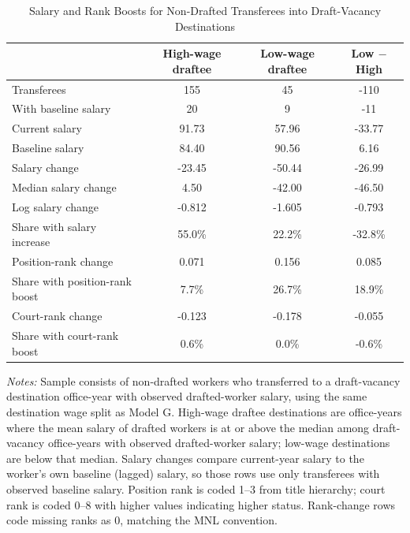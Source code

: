 \begin{table}[htbp]
\centering
\caption{Salary and Rank Boosts for Non-Drafted Transferees into Draft-Vacancy Destinations}
\label{tab:misallocation-destination-draftee-wage}
\footnotesize
\begin{threeparttable}
\begin{tabular}{lccc}
\toprule
 & High-wage draftee & Low-wage draftee & Low $-$ High \\
\midrule
Transferees & 155 & 45 & -110 \\
With baseline salary & 20 & 9 & -11 \\
Current salary & 91.73 & 57.96 & -33.77 \\
Baseline salary & 84.40 & 90.56 & 6.16 \\
Salary change & -23.45 & -50.44 & -26.99 \\
Median salary change & 4.50 & -42.00 & -46.50 \\
Log salary change & -0.812 & -1.605 & -0.793 \\
Share with salary increase & 55.0\% & 22.2\% & -32.8\% \\
\midrule
Position-rank change & 0.071 & 0.156 & 0.085 \\
Share with position-rank boost & 7.7\% & 26.7\% & 18.9\% \\
Court-rank change & -0.123 & -0.178 & -0.055 \\
Share with court-rank boost & 0.6\% & 0.0\% & -0.6\% \\
\bottomrule
\end{tabular}
\begin{tablenotes}[flushleft]\footnotesize
\item \textit{Notes:} Sample consists of non-drafted workers who transferred to a draft-vacancy destination office-year with observed drafted-worker salary, using the same destination wage split as Model G. High-wage draftee destinations are office-years where the mean salary of drafted workers is at or above the median among draft-vacancy office-years with observed drafted-worker salary; low-wage destinations are below that median. Salary changes compare current-year salary to the worker's own baseline (lagged) salary, so those rows use only transferees with observed baseline salary. Position rank is coded 1--3 from title hierarchy; court rank is coded 0--8 with higher values indicating higher status. Rank-change rows code missing ranks as 0, matching the MNL convention.
\end{tablenotes}\end{threeparttable}\end{table}
